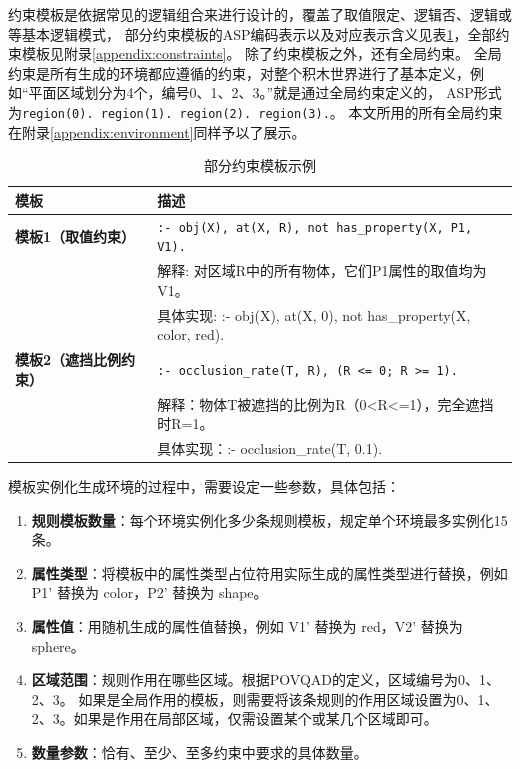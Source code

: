 约束模板是依据常见的逻辑组合来进行设计的，覆盖了取值限定、逻辑否、逻辑或等基本逻辑模式，
部分约束模板的ASP编码表示以及对应表示含义见表\ref{tab:asp_templates}，全部约束模板见附录\ref{appendix:constraints}。
除了约束模板之外，还有全局约束。
全局约束是所有生成的环境都应遵循的约束，对整个积木世界进行了基本定义，例如“平面区域划分为4个，编号0、1、2、3。”就是通过全局约束定义的，
ASP形式为\texttt{region(0). region(1). region(2). region(3).}。
本文所用的所有全局约束在附录\ref{appendix:environment}同样予以了展示。
\begin{table}[h]
    \centering
    \renewcommand{\arraystretch}{1.0}
    \begin{tabular}{|p{2.8cm}|p{12.2cm}|}
        \hline
        \textbf{模板} & \textbf{描述} \\
        \hline
        \textbf{模板1（取值约束）} & 
        \texttt{:- obj(X), at(X, R), not has\_property(X, P1, V1).} \\ 
        & 解释: 对区域R中的所有物体，它们P1属性的取值均为V1。 \\ 
        & 具体实现: :- obj(X), at(X, 0), not has\_property(X, color, red). \\
        \hline
        \textbf{模板2（遮挡比例约束）} & 
        \texttt{:- occlusion\_rate(T, R), (R <= 0; R >= 1).} \\ 
        & 解释：物体T被遮挡的比例为R（0<R<=1），完全遮挡时R=1。 \\ 
        & 具体实现：:- occlusion\_rate(T, 0.1). \\
        \hline
    \end{tabular}
    \caption{部分约束模板示例}
    \label{tab:asp_templates}
\end{table}

模板实例化生成环境的过程中，需要设定一些参数，具体包括：
\begin{enumerate}[nosep]
\item \textbf{规则模板数量}：每个环境实例化多少条规则模板，规定单个环境最多实例化15条。
\item \textbf{属性类型}：将模板中的属性类型占位符用实际生成的属性类型进行替换，例如 P1' 替换为 color，P2' 替换为 shape。
\item \textbf{属性值}：用随机生成的属性值替换，例如 V1' 替换为 red，V2' 替换为 sphere。
\item \textbf{区域范围}：规则作用在哪些区域。根据POVQAD的定义，区域编号为0、1、2、3。
如果是全局作用的模板，则需要将该条规则的作用区域设置为0、1、2、3。如果是作用在局部区域，仅需设置某个或某几个区域即可。
\item \textbf{数量参数}：恰有、至少、至多约束中要求的具体数量。
\end{enumerate}

